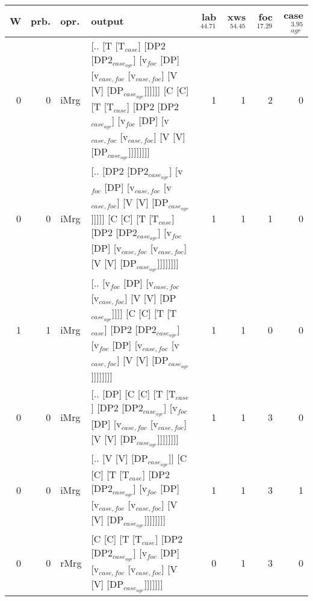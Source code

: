 \begin{tabularx}{\linewidth}{rrlXrrrr}
\hline
   W &   prb. & opr.   & output                                                                                                                                                                                                     &   lab$^{44.71}$ &   xws$^{54.45}$ &   foc$^{17.29}$ &   case$_{agr}^{3.95}$ \\
\hline
   0 &   0 & iMrg & [.. [T [T$_{case}$] [DP2 [DP2$_{case_{agr}}$] [v$_{foc}$ [DP] [v$_{case,foc}$ [v$_{case,foc}$] [V [V] [DP$_{case_{agr}}$]]]]]] [C [C] [T [T$_{case}$] [DP2 [DP2$_{case_{agr}}$] [v$_{foc}$ [DP] [v$_{case,foc}$ [v$_{case,foc}$] [V [V] [DP$_{case_{agr}}$]]]]]]]] &             1 &             1 &             2 &                  0 \\
   0 &   0 & iMrg & [.. [DP2 [DP2$_{case_{agr}}$] [v$_{foc}$ [DP] [v$_{case,foc}$ [v$_{case,foc}$] [V [V] [DP$_{case_{agr}}$]]]]] [C [C] [T [T$_{case}$] [DP2 [DP2$_{case_{agr}}$] [v$_{foc}$ [DP] [v$_{case,foc}$ [v$_{case,foc}$] [V [V] [DP$_{case_{agr}}$]]]]]]]]              &             1 &             1 &             1 &                  0 \\
   1 &   1 & iMrg & [.. [v$_{foc}$ [DP] [v$_{case,foc}$ [v$_{case,foc}$] [V [V] [DP$_{case_{agr}}$]]]] [C [C] [T [T$_{case}$] [DP2 [DP2$_{case_{agr}}$] [v$_{foc}$ [DP] [v$_{case,foc}$ [v$_{case,foc}$] [V [V] [DP$_{case_{agr}}$]]]]]]]]                                   &             1 &             1 &             0 &                  0 \\
   0 &   0 & iMrg & [.. [DP] [C [C] [T [T$_{case}$] [DP2 [DP2$_{case_{agr}}$] [v$_{foc}$ [DP] [v$_{case,foc}$ [v$_{case,foc}$] [V [V] [DP$_{case_{agr}}$]]]]]]]]                                                                                           &             1 &             1 &             3 &                  0 \\
   0 &   0 & iMrg & [.. [V [V] [DP$_{case_{agr}}$]] [C [C] [T [T$_{case}$] [DP2 [DP2$_{case_{agr}}$] [v$_{foc}$ [DP] [v$_{case,foc}$ [v$_{case,foc}$] [V [V] [DP$_{case_{agr}}$]]]]]]]]                                                                          &             1 &             1 &             3 &                  1 \\
   0 &   0 & rMrg & [C [C] [T [T$_{case}$] [DP2 [DP2$_{case_{agr}}$] [v$_{foc}$ [DP] [v$_{case,foc}$ [v$_{case,foc}$] [V [V] [DP$_{case_{agr}}$]]]]]]]                                                                                                     &             0 &             1 &             3 &                  0 \\
\hline
\end{tabularx}\endgroup\\
